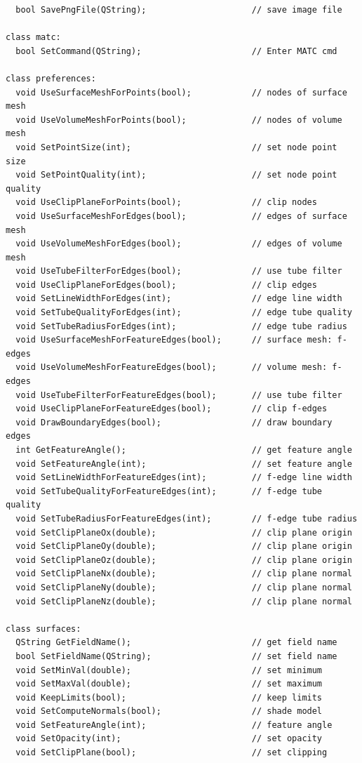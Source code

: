 \documentclass[a4paper,12pt]{article}
\begin{document}
\begin{footnotesize}
\begin{verbatim}
  bool SavePngFile(QString);                     // save image file

class matc:
  bool SetCommand(QString);                      // Enter MATC cmd

class preferences:
  void UseSurfaceMeshForPoints(bool);            // nodes of surface mesh
  void UseVolumeMeshForPoints(bool);             // nodes of volume mesh
  void SetPointSize(int);                        // set node point size
  void SetPointQuality(int);                     // set node point quality
  void UseClipPlaneForPoints(bool);              // clip nodes
  void UseSurfaceMeshForEdges(bool);             // edges of surface mesh
  void UseVolumeMeshForEdges(bool);              // edges of volume mesh
  void UseTubeFilterForEdges(bool);              // use tube filter
  void UseClipPlaneForEdges(bool);               // clip edges
  void SetLineWidthForEdges(int);                // edge line width
  void SetTubeQualityForEdges(int);              // edge tube quality
  void SetTubeRadiusForEdges(int);               // edge tube radius
  void UseSurfaceMeshForFeatureEdges(bool);      // surface mesh: f-edges
  void UseVolumeMeshForFeatureEdges(bool);       // volume mesh: f-edges
  void UseTubeFilterForFeatureEdges(bool);       // use tube filter
  void UseClipPlaneForFeatureEdges(bool);        // clip f-edges
  void DrawBoundaryEdges(bool);                  // draw boundary edges
  int GetFeatureAngle();                         // get feature angle
  void SetFeatureAngle(int);                     // set feature angle
  void SetLineWidthForFeatureEdges(int);         // f-edge line width
  void SetTubeQualityForFeatureEdges(int);       // f-edge tube quality
  void SetTubeRadiusForFeatureEdges(int);        // f-edge tube radius
  void SetClipPlaneOx(double);                   // clip plane origin
  void SetClipPlaneOy(double);                   // clip plane origin
  void SetClipPlaneOz(double);                   // clip plane origin
  void SetClipPlaneNx(double);                   // clip plane normal
  void SetClipPlaneNy(double);                   // clip plane normal
  void SetClipPlaneNz(double);                   // clip plane normal

class surfaces:
  QString GetFieldName();                        // get field name
  bool SetFieldName(QString);                    // set field name
  void SetMinVal(double);                        // set minimum
  void SetMaxVal(double);                        // set maximum
  void KeepLimits(bool);                         // keep limits
  void SetComputeNormals(bool);                  // shade model
  void SetFeatureAngle(int);                     // feature angle
  void SetOpacity(int);                          // set opacity
  void SetClipPlane(bool);                       // set clipping


\end{verbatim}
\end{footnotesize}
\end{document}
